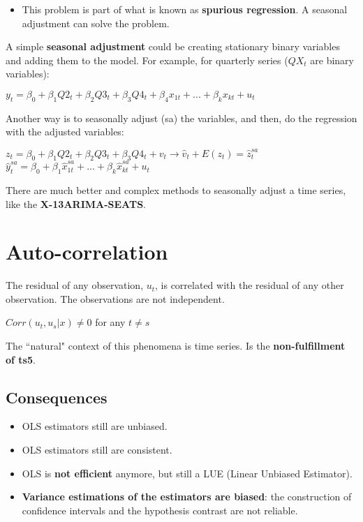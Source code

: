 \documentclass[10pt, a4paper, landscape]{extarticle}
\begin{document}
\begin{multicols}{3}
\begin{multicols}{2}
		\end{multicols}
		\begin{itemize}[leftmargin=*]
			\item This problem is part of what is known as \textbf{spurious regression}. A seasonal adjustment can solve the problem.
		\end{itemize}
		A simple \textbf{seasonal adjustment} could be creating stationary binary variables and adding them to the model. For example, for quarterly series ($QX_t$ are binary variables):
		\begin{center}
			$y_t = \beta_0 + \beta_1 Q2_t + \beta_2 Q3_t + \beta_3 Q4_t + \beta_4 x_{1t} + ... + \beta_k x_{kt} + u_t$
		\end{center}
		Another way is to seasonally adjust (sa) the variables, and then, do the regression with the adjusted variables:
		\begin{center}
			$z_t = \beta_0 + \beta_1 Q2_t + \beta_2 Q3_t + \beta_3 Q4_t  + v_t \rightarrow \hat{v}_t + E(z_t) = \hat{z}_t^{sa}$
			$\hat{y}_t^{sa} = \beta_0 + \beta_1 \hat{x}_{1t}^{sa} + ... + \beta_k \hat{x}_{kt}^{sa} + u_t$
		\end{center}
		There are much better and complex methods to seasonally adjust a time series, like the \textbf{X-13ARIMA-SEATS}.
		
\columnbreak

\section*{Auto-correlation}
	The residual of any observation, $u_t$, is correlated with the residual of any other observation. The observations are not independent.
	\begin{center}
		$Corr(u_t, u_s | x) \neq 0$ for any $t \neq s$
	\end{center}
	The ``natural" context of this phenomena is time series. Is the \textbf{non-fulfillment of ts5}.
	\subsection*{Consequences}
		\begin{itemize}[leftmargin=*]
			\item OLS estimators still are unbiased.
			\item OLS estimators still are consistent.
			\item OLS is \textbf{not efficient} anymore, but still a LUE (Linear Unbiased Estimator).
			\item \textbf{Variance estimations of the estimators are biased}: the construction of confidence intervals and the hypothesis contrast are not reliable.
		\end{itemize}

\end{multicols}
\end{document}
